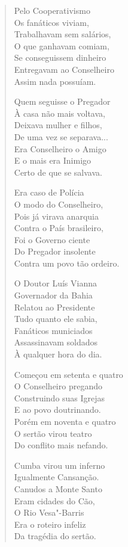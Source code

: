 \begin{verse}
Pelo Cooperativismo \\
Os fanáticos viviam, \\
Trabalhavam sem salários, \\
O que ganhavam comiam, \\
Se conseguissem dinheiro \\
Entregavam ao Conselheiro \\
Assim nada possuíam. 

Quem seguisse o Pregador \\
À casa não mais voltava, \\
Deixava mulher e filhos, \\
De uma vez se separava... \\
Era Conselheiro o Amigo \\
E o mais era Inimigo \\
Certo de que se salvava. 

Era caso de Polícia \\
O modo do Conselheiro, \\
Pois já virava anarquia \\
Contra o País brasileiro, \\
Foi o Governo ciente \\
Do Pregador insolente \\
Contra um povo tão ordeiro.


O Doutor Luís Vianna \\
Governador da Bahia \\
Relatou ao Presidente \\
Tudo quanto ele sabia, \\
Fanáticos municiados \\
Assassinavam soldados \\
À qualquer hora do dia. 

Começou em setenta e quatro \\
O Conselheiro pregando \\
Construindo suas Igrejas \\
E ao povo doutrinando. \\
Porém em noventa e quatro \\
O sertão virou teatro \\
Do conflito mais nefando. 

Cumba virou um inferno \\
Igualmente Cansanção. \\
Canudos a Monte Santo \\
Eram cidades do Cão, \\
O Rio Vesa"-Barris \\
Era o roteiro infeliz \\
Da tragédia do sertão. 


\end{verse}
